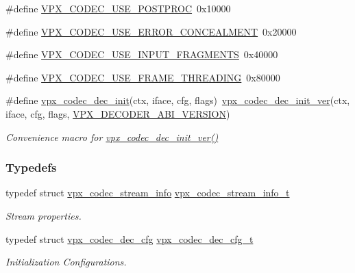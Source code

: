 \begin{DoxyCompactItemize}
\item 
\#define \hyperlink{group__decoder_ga6fe14f30254aff769412b128b29664cc}{V\+P\+X\+\_\+\+C\+O\+D\+E\+C\+\_\+\+U\+S\+E\+\_\+\+P\+O\+S\+T\+P\+R\+OC}~0x10000
\item 
\#define \hyperlink{group__decoder_ga520d7005e360202f5844982fa2392581}{V\+P\+X\+\_\+\+C\+O\+D\+E\+C\+\_\+\+U\+S\+E\+\_\+\+E\+R\+R\+O\+R\+\_\+\+C\+O\+N\+C\+E\+A\+L\+M\+E\+NT}~0x20000
\item 
\#define \hyperlink{group__decoder_ga378855a0318396d6e4e585bd3bacbf3f}{V\+P\+X\+\_\+\+C\+O\+D\+E\+C\+\_\+\+U\+S\+E\+\_\+\+I\+N\+P\+U\+T\+\_\+\+F\+R\+A\+G\+M\+E\+N\+TS}~0x40000
\item 
\#define \hyperlink{group__decoder_ga203295122fe98b675f94f4409d4684e0}{V\+P\+X\+\_\+\+C\+O\+D\+E\+C\+\_\+\+U\+S\+E\+\_\+\+F\+R\+A\+M\+E\+\_\+\+T\+H\+R\+E\+A\+D\+I\+NG}~0x80000
\item 
\#define \hyperlink{group__decoder_ga8c2f0b12f1bd4927eb3c68b01eab19d3}{vpx\+\_\+codec\+\_\+dec\+\_\+init}(ctx,  iface,  cfg,  flags)~\hyperlink{group__decoder_ga6435c3e8cb9408f1c0c3d052a3a577b7}{vpx\+\_\+codec\+\_\+dec\+\_\+init\+\_\+ver}(ctx, iface, cfg, flags, \hyperlink{group__decoder_ga462b459e7ae13937e1eae1776245db12}{V\+P\+X\+\_\+\+D\+E\+C\+O\+D\+E\+R\+\_\+\+A\+B\+I\+\_\+\+V\+E\+R\+S\+I\+ON})
\begin{DoxyCompactList}\small\item\em Convenience macro for \hyperlink{group__decoder_ga6435c3e8cb9408f1c0c3d052a3a577b7}{vpx\+\_\+codec\+\_\+dec\+\_\+init\+\_\+ver()} \end{DoxyCompactList}\end{DoxyCompactItemize}
\subsubsection*{Typedefs}
\begin{DoxyCompactItemize}
\item 
typedef struct \hyperlink{structvpx__codec__stream__info}{vpx\+\_\+codec\+\_\+stream\+\_\+info} \hyperlink{group__decoder_ga900420e8f7cb9c1b3070b2ba7d636974}{vpx\+\_\+codec\+\_\+stream\+\_\+info\+\_\+t}
\begin{DoxyCompactList}\small\item\em Stream properties. \end{DoxyCompactList}\item 
typedef struct \hyperlink{structvpx__codec__dec__cfg}{vpx\+\_\+codec\+\_\+dec\+\_\+cfg} \hyperlink{group__decoder_ga4a2e808eb43f1e798024b5a409c484f9}{vpx\+\_\+codec\+\_\+dec\+\_\+cfg\+\_\+t}
\begin{DoxyCompactList}\small\item\em Initialization Configurations. \end{DoxyCompactList}\end{DoxyCompactItemize}
